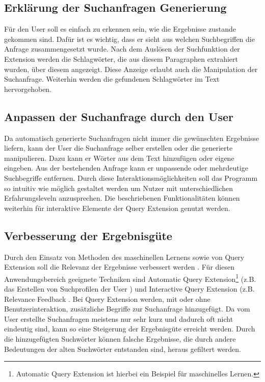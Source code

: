  \subsection{Erklärung der Suchanfragen Generierung}
 \label{ssec:suchanfragenGenerierung}
 Für den User soll es einfach zu erkennen sein, wie die Ergebnisse zustande gekommen sind. Dafür ist es wichtig, dass er sieht aus welchen Suchbegriffen die Anfrage zusammengesetzt wurde. Nach dem Auslösen der Suchfunktion der Extension werden die Schlagwörter, die aus diesem Paragraphen extrahiert wurden, über diesem angezeigt. Diese Anzeige erlaubt auch die Manipulation der Suchanfrage. Weiterhin werden die gefundenen Schlagwörter im Text hervorgehoben.

 \subsection{Anpassen der Suchanfrage durch den User}
 Da automatisch generierte Suchanfragen nicht immer die gewünschten Ergebnisse liefern, kann der User die Suchanfrage selber erstellen oder die generierte manipulieren. Dazu kann er Wörter aus dem Text hinzufügen oder eigene eingeben. Aus der bestehenden Anfrage kann er unpassende oder mehrdeutige Suchbegriffe entfernen. Durch diese Interaktionsmöglichkeiten soll das Programm so intuitiv wie möglich gestaltet werden um Nutzer mit unterschiedlichen Erfahrungsleveln anzusprechen. Die beschriebenen Funktionalitäten können weiterhin für interaktive Elemente der Query Extension genutzt werden.

 \subsection{Verbesserung der Ergebnisgüte}
 Durch den Einsatz von Methoden des maschinellen Lernens sowie von Query Extension soll die Relevanz der Ergebnisse verbessert werden \cite{ruthven2003re}. Für diesen Anwendungsbereich geeignete Techniken sind Automatic Query Extension\footnote{Automatic Query Extension ist hierbei ein Beispiel für maschinelles Lernen.} (z.B. das Erstellen von Suchprofilen der User \cite{budzik2000user}) und Interactive Query Extension (z.B. Relevance Feedback \cite{harman1988towards}. Bei Query Extension werden, mit oder ohne Benutzerinteraktion, zusätzliche Begriffe zur Suchanfrage hinzugefügt. Da vom User erstellte Suchanfragen meistens nur sehr kurz \cite{ruthven2003re} und dadurch oft nicht eindeutig sind, kann so eine Steigerung der Ergebnisgüte erreicht werden. Durch die hinzugefügten Suchwörter können falsche Ergebnisse, die durch andere Bedeutungen der alten Suchwörter entstanden sind, heraus gefiltert werden.

